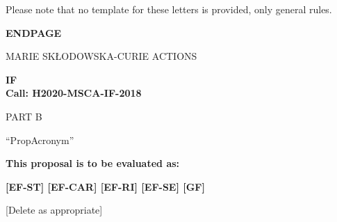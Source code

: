 \noindent
Please note that no template for these letters is provided, only general rules.





\newpage
\label{sec:endpage}
\vspace{15mm}
\begin{center}


        \Large{
      
     
        \textbf{ENDPAGE}
  
          \vspace{15mm}
          MARIE SK\L{}ODOWSKA-CURIE ACTIONS\\
          \vspace{1cm}
          
          \textbf{\acf{IF}}\\
          \textbf{Call: H2020-MSCA-IF-2018}
          \vspace{2cm}                   

          PART B
          \vspace{2.5cm}

          ``{\sc \ac{PropAcronym}\xspace}''
          \vspace{2cm}

          \textbf{This proposal is to be evaluated as:}
          \vspace{.5cm}

          \textbf{[EF-ST] [EF-CAR] [EF-RI] [EF-SE] [GF]}\\
        }
        \large{[Delete as appropriate]}

  \end{center}
\vspace{1cm}

